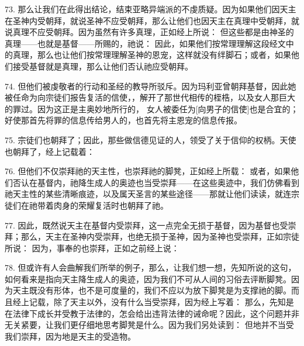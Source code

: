 73. 那么让我们在此得出结论，结束亚略异端派的不虔质疑。因为如果他们因天主在圣神内受朝拜，就说圣神不应受朝拜，那么让他们也因天主在真理中受朝拜，就说真理不应受朝拜。因为虽然有许多真理，正如经上所说： 但这些都是由神圣的真理——也就是基督——所赐的，祂说：  因此，如果他们按常理理解这段经文中的真理，那么也让他们按常理理解圣神的恩宠，这样就没有绊脚石；或者，如果他们接受基督就是真理，那么让他们否认祂应受朝拜。\par

74. 但他们被虔敬者的行动和圣经的教导所驳斥。因为玛利亚曾朝拜基督，因此她被任命为向宗徒们报告复活的信使，，解开了那世代相传的桎梏，以及女人那巨大的罪过。因为这正是主奥妙地所行的，  女人被委任为[向男子的信使]也是合宜的；好使那首先将罪的信息传给男人的，也首先将主恩宠的信息传报。\par

75. 宗徒们也朝拜了；因此，那些做信德见证的人，领受了关于信仰的权柄。天使也朝拜了，经上记载着： \par

76. 但他们不仅崇拜祂的天主性，也崇拜祂的脚凳，正如经上所载： 或者，如果他们否认在基督内，祂降生成人的奥迹也当受崇拜——在这些奥迹中，我们仿佛看到祂天主性的某些清晰痕迹，以及属天圣言的某些途径——那就让他们读读，就连宗徒们在祂带着肉身的荣耀复活时也朝拜了祂。\par

77. 因此，既然说天主在基督内受崇拜，这一点完全无损于基督，因为基督也受崇拜；那么，天主在圣神内受崇拜，也绝无损于圣神，因为圣神也受崇拜，正如宗徒所说：  因为，事奉的也崇拜，正如之前经上说： \par

78. 但或许有人会曲解我们所举的例子，那么，让我们想一想，先知所说的这句，如何看来是指向天主降生成人的奥迹，因为我们不可从人间的习俗去评断脚凳。因为天主既没有形体，也不是可度量的，我们不应以为放下脚凳是为支撑祂的脚。而且经上记载，除了天主以外，没有什么当受崇拜，因为经上写着： 那么，先知是在法律下成长并受教于法律的，怎会给出违背法律的诫命呢？因此，这个问题并非无关紧要，让我们更仔细地思考脚凳是什么。因为我们另处读到：  但地并不当受我们崇拜，因为地是天主的受造物。\par

